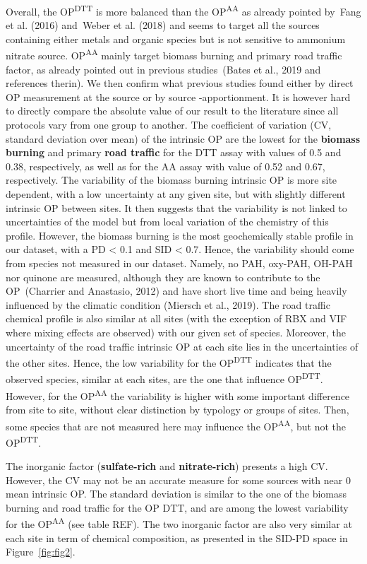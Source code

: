 \documentclass[
]{article}
\begin{document}
Overall, the OP\textsuperscript{DTT} is more balanced than the
OP\textsuperscript{AA} as already pointed by~Fang et al. (2016)
and~Weber et al. (2018) and seems to target all the sources containing
either metals and organic species but is not sensitive to ammonium
nitrate source. OP\textsuperscript{AA} mainly target biomass burning and
primary road traffic factor, as already pointed out in previous
studies~(Bates et al., 2019 and references therin). We then confirm what
previous studies found either by direct OP measurement at the source or
by source -apportionment. It is however hard to directly compare the
absolute value of our result to the literature since all protocols vary
from one group to another. The coefficient of variation (CV, standard
deviation over mean) of the intrinsic OP are the lowest for the
\textbf{biomass burning} and primary \textbf{road traffic} for the DTT
assay with values of 0.5 and 0.38, respectively, as well as for the AA
assay with value of 0.52 and 0.67, respectively. The variability of the
biomass burning intrinsic OP is more site dependent, with a low
uncertainty at any given site, but with slightly different intrinsic OP
between sites. It then suggests that the variability is not linked to
uncertainties of the model but from local variation of the chemistry of
this profile. However, the biomass burning is the most geochemically
stable profile in our dataset, with a PD \textless{} 0.1 and SID
\textless{} 0.7. Hence, the variability should come from species not
measured in our dataset. Namely, no PAH, oxy-PAH, OH-PAH nor quinone are
measured, although they are known to contribute to the OP~(Charrier and
Anastasio, 2012) and have short live time and being heavily influenced
by the climatic condition (Miersch et al., 2019). The road traffic
chemical profile is also similar at all sites (with the exception of RBX
and VIF where mixing effects are observed) with our given set of
species. Moreover, the uncertainty of the road traffic intrinsic OP at
each site lies in the uncertainties of the other sites. Hence, the low
variability for the OP\textsuperscript{DTT} indicates that the observed
species, similar at each sites, are the one that influence
OP\textsuperscript{DTT}. However, for the OP\textsuperscript{AA} the
variability is higher with some important difference from site to site,
without clear distinction by typology or groups of sites. Then, some
species that are not measured here may influence the
OP\textsuperscript{AA}, but not the OP\textsuperscript{DTT}.

The inorganic factor (\textbf{sulfate-rich} and \textbf{nitrate-rich})
presents a high CV. However, the CV may not be an accurate measure for
some sources with near 0 mean intrinsic OP. The standard deviation is
similar to the one of the biomass burning and road traffic for the OP
DTT, and are among the lowest variability for the OP\textsuperscript{AA}
(see table REF). The two inorganic factor are also very similar at each
site in term of chemical composition, as presented in the SID-PD space
in Figure~\protect\hyperlink{fig:fig2}{{[}fig:fig2{]}}.
\end{document}
